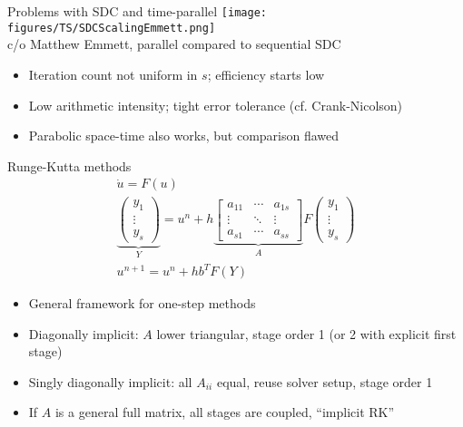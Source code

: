 \documentclass{beamer}
\begin{document}
\begin{frame}{Problems with SDC and time-parallel}
  \texttt{[image: figures/TS/SDCScalingEmmett.png]} \\
  c/o Matthew Emmett, parallel compared to sequential SDC
  \begin{itemize}
  \item Iteration count not uniform in $s$; efficiency starts low
  \item Low arithmetic intensity; tight error tolerance (cf. Crank-Nicolson)
  \item Parabolic space-time also works, but comparison flawed
  \end{itemize}
\end{frame}

\begin{frame}{Runge-Kutta methods}
  \begin{gather*}
    \dot u = F(u) \\
    \underbrace{
    \begin{pmatrix}
      y_1 \\
      \vdots \\
      y_s
    \end{pmatrix}}_Y =
    u^{n} + h
    \underbrace{
    \begin{bmatrix}
      a_{11} & \dotsb & a_{1s} \\
      \vdots & \ddots & \vdots \\
      a_{s1} & \dotsb & a_{ss}
    \end{bmatrix}}_A
    F
    \begin{pmatrix}
      y_1 \\
      \vdots \\
      y_s
    \end{pmatrix} \\
    u^{n+1} = u^n + h b^T F(Y)
  \end{gather*}
  \begin{itemize}
  \item General framework for one-step methods
  \item Diagonally implicit: $A$ lower triangular, stage order 1 (or 2 with explicit first stage)
  \item Singly diagonally implicit: all $A_{ii}$ equal, reuse solver setup, stage order 1
  \item If $A$ is a general full matrix, all stages are coupled, ``implicit RK''
  \end{itemize}
\end{frame}
\end{document}
